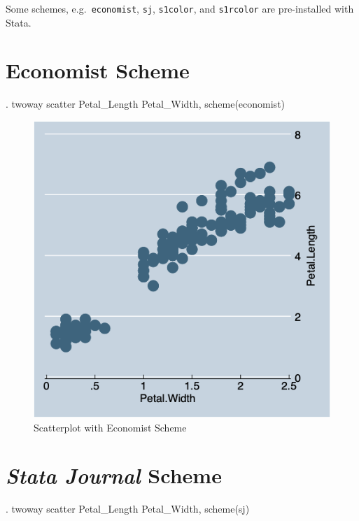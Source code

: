 \documentclass[
]{article}
\begin{document}
Some schemes, e.g.~\texttt{economist}, \texttt{sj}, \texttt{s1color},
and \texttt{s1rcolor} are pre-installed with Stata.

\hypertarget{economist-scheme}{%
\section{Economist Scheme}\label{economist-scheme}}

\begin{stlog}
. twoway scatter Petal_Length Petal_Width, scheme(economist)
\end{stlog}



\begin{figure}
\centering
\includegraphics[width=0.75\linewidth]{econscatter.png}
\caption{Scatterplot with Economist Scheme}
\end{figure}

\hypertarget{stata-journal-scheme}{%
\section{\texorpdfstring{\emph{Stata Journal}
Scheme}{Stata Journal Scheme}}\label{stata-journal-scheme}}

\begin{stlog}
. twoway scatter Petal_Length Petal_Width, scheme(sj)
\end{stlog}
\end{document}
